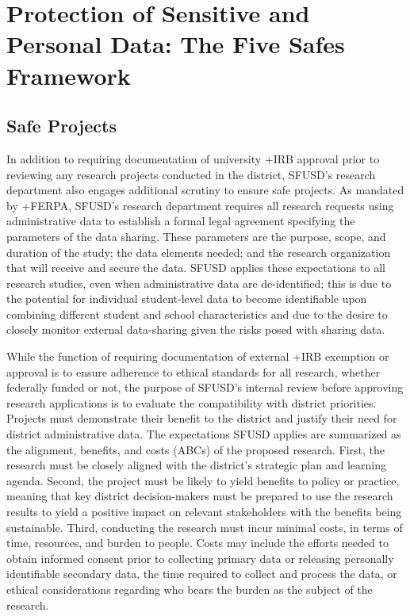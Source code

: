 \documentclass[
]{book}
\begin{document}
\hypertarget{protection-of-sensitive-and-personal-data-the-five-safes-framework-5}{%
\section{Protection of Sensitive and Personal Data: The Five Safes Framework}\label{protection-of-sensitive-and-personal-data-the-five-safes-framework-5}}

\hypertarget{safe-projects-5}{%
\subsection{Safe Projects}\label{safe-projects-5}}

In addition to requiring documentation of university +IRB\textbar{} approval prior to reviewing any research projects conducted in the district, SFUSD's research department also engages additional scrutiny to ensure safe projects. As mandated by +FERPA\textbar, SFUSD's research department requires all research requests using administrative data to establish a formal legal agreement specifying the parameters of the data sharing. These parameters are the purpose, scope, and duration of the study; the data elements needed; and the research organization that will receive and secure the data. SFUSD applies these expectations to all research studies, even when administrative data are de-identified; this is due to the potential for individual student-level data to become identifiable upon combining different student and school characteristics and due to the desire to closely monitor external data-sharing given the risks posed with sharing data.

While the function of requiring documentation of external +IRB\textbar{} exemption or approval is to ensure adherence to ethical standards for all research, whether federally funded or not, the purpose of SFUSD's internal review before approving research applications is to evaluate the compatibility with district priorities. Projects must demonstrate their benefit to the district and justify their need for district administrative data. The expectations SFUSD applies are summarized as the alignment, benefits, and costs (ABCs) of the proposed research. First, the research must be closely aligned with the district's strategic plan and learning agenda. Second, the project must be likely to yield benefits to policy or practice, meaning that key district decision-makers must be prepared to use the research results to yield a positive impact on relevant stakeholders with the benefits being sustainable. Third, conducting the research must incur minimal costs, in terms of time, resources, and burden to people. Costs may include the efforts needed to obtain informed consent prior to collecting primary data or releasing personally identifiable secondary data, the time required to collect and process the data, or ethical considerations regarding who bears the burden as the subject of the research.
\end{document}
